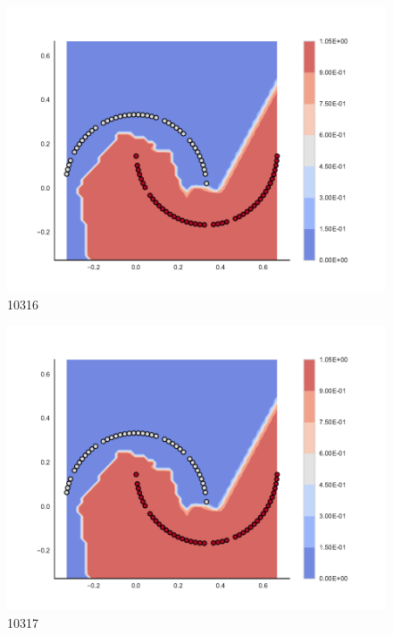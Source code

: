 \begin{subfigure}[b]{0.09\textwidth}
    \includegraphics[clip, trim=2.35cm 1.75cm 4.5cm 0cm,width=\textwidth]{img/convergence/10316.pdf}
    \caption{10316}
    \label{fig:convergence_10316}
\end{subfigure}
%
\begin{subfigure}[b]{0.09\textwidth}
    \includegraphics[clip, trim=2.35cm 1.75cm 4.5cm 0cm,width=\textwidth]{img/convergence/10317.pdf}
    \caption{10317}
    \label{fig:convergence_10317}
\end{subfigure}
%
